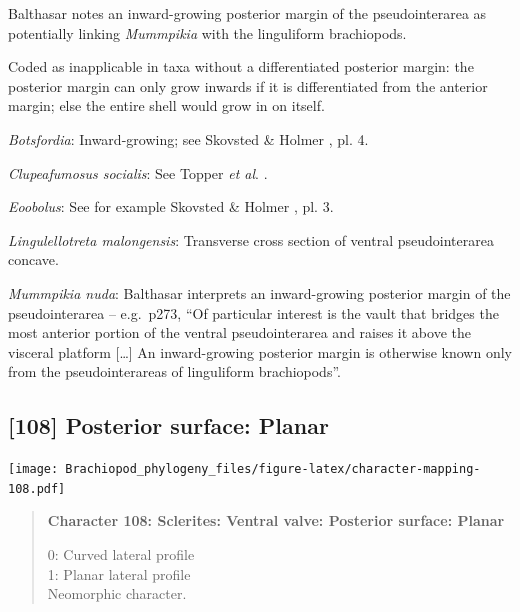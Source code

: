 \documentclass[openany]{book}
\begin{document}
Balthasar \citeyearpar{Balthasar2008iMummpikia} notes an inward-growing
posterior margin of the pseudointerarea as potentially linking
\emph{Mummpikia} with the linguliform brachiopods.

Coded as inapplicable in taxa without a differentiated posterior margin:
the posterior margin can only grow inwards if it is differentiated from
the anterior margin; else the entire shell would grow in on itself.

\hypertarget{Botsfordia-coding-107}{}
\emph{Botsfordia}: Inward-growing; see Skovsted \& Holmer
\citeyearpar{Skovsted2005EarlyCambrian}, pl. 4.

\hypertarget{Clupeafumosus_socialis-coding-107}{}
\emph{Clupeafumosus socialis}: See Topper \emph{et al}.
\citeyearpar{Topper2013Reappraisalof}.

\hypertarget{Eoobolus-coding-107}{}
\emph{Eoobolus}: See for example Skovsted \& Holmer
\citeyearpar{Skovsted2005EarlyCambrian}, pl. 3.

\hypertarget{Lingulellotreta_malongensis-coding-107}{}
\emph{Lingulellotreta malongensis}: Transverse cross section of ventral
pseudointerarea concave.

\hypertarget{Mummpikia_nuda-coding-107}{}
\emph{Mummpikia nuda}: Balthasar \citeyearpar{Balthasar2008iMummpikia}
interprets an inward-growing posterior margin of the pseudointerarea --
e.g.~p273, ``Of particular interest is the vault that bridges the most
anterior portion of the ventral pseudointerarea and raises it above the
visceral platform {[}\ldots{}{]} An inward-growing posterior margin is
otherwise known only from the pseudointerareas of linguliform
brachiopods''.

\subsection*{{[}108{]} Posterior surface:
Planar}\label{posterior-surface-planar}

\texttt{[image: Brachiopod\_phylogeny\_files/figure-latex/character-mapping-108.pdf]}

\begin{quote}
\textbf{Character 108: Sclerites: Ventral valve: Posterior surface:
Planar}

0: Curved lateral profile\\
1: Planar lateral profile\\
Neomorphic character.
\end{quote}
\end{document}
